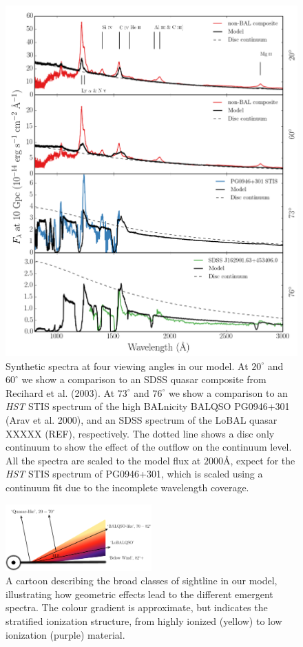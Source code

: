 \documentclass[useAMS,usenatbib]{mn2e_x}
\begin{document}
\begin{figure} %
\centering
\includegraphics[width=1.0\textwidth]{figures/uvspec_new.png}
\caption
{
Synthetic spectra at four viewing angles in our model. At 
$20^\circ$ and $60^\circ$ we show a comparison to an SDSS quasar composite
from Recihard et al. (2003). At $73^\circ$ and $76^\circ$ we show a comparison to
an {\sl HST} STIS spectrum of the high BALnicity BALQSO 
PG0946+301 (Arav et al. 2000), and an SDSS spectrum of the LoBAL quasar 
XXXXX (REF), respectively. The dotted line shows a disc
only continuum to show the effect of the outflow on the continuum level. 
All the spectra are scaled to the model flux at $2000$\AA, expect for the 
{\sl HST} STIS spectrum of PG0946+301, which is scaled using a continuum fit
due to the incomplete wavelength coverage.
}
\label{fig:uvspec}
\end{figure} %

\begin{figure} 
\centering
\includegraphics[width=0.5\textwidth]{figures/windnew3.png}
\caption
{
A cartoon describing the broad classes of sightline 
in our model, illustrating how geometric effects lead to 
the different emergent spectra. The colour gradient is approximate,
but indicates the stratified ionization structure, 
from highly ionized (yellow) to low ionization (purple) material.
}
\label{fig:sightline}
\end{figure} 
\end{document}
